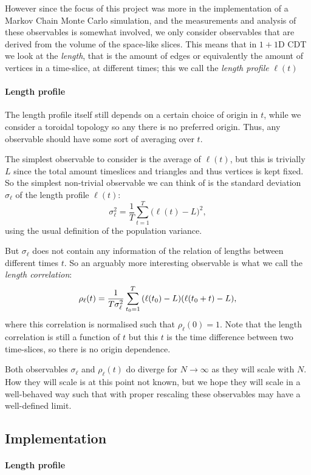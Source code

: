 However since the focus of this project was more in the implementation of a Markov Chain Monte Carlo simulation, and the measurements and analysis of these observables is somewhat involved, we only consider observables that are derived from the volume of the space-like slices.
This means that in $1 + 1$D CDT we look at the \emph{length}, that is the amount of edges or equivalently the amount of vertices in a time-slice, at different times; this we call the \emph{length profile} $\ell(t)$

\paragraph{Length profile}
The length profile itself still depends on a certain choice of origin in $t$, while we consider a toroidal topology so any there is no preferred origin. Thus, any observable should have some sort of averaging over $t$.

The simplest observable to consider is the average of $\ell(t)$, but this is trivially $L$ since the total amount timeslices and triangles and thus vertices is kept fixed.
So the simplest non-trivial observable we can think of is the standard deviation $\sigma_\ell$ of the length profile $\ell(t)$:
\begin{equation}
    \sigma_\ell^2 = \frac{1}{T} \sum_{t = 1}^{T} \Big(\ell(t) - L\Big)^2,
\end{equation}
using the usual definition of the population variance.

But $\sigma_\ell$ does not contain any information of the relation of lengths between different times $t$.
So an arguably more interesting observable is what we call the \emph{length correlation}:
\begin{equation}
    \rho_\ell(t) = \frac{1}{T \sigma_\ell^2} \sum_{t_0 = 1}^{T} \qty(\ell(t_0) - L)\qty(\ell(t_0 + t) - L),
\end{equation}
where this correlation is normalised such that $\rho_\ell(0) = 1$.
Note that the length correlation is still a function of $t$ but this $t$ is the time difference between two time-slices, so there is no origin dependence.

Both observables $\sigma_\ell$ and $\rho_\ell(t)$ do diverge for $N \rightarrow \infty$ as they will scale with $N$.
How they will scale is at this point not known, but we hope they will scale in a well-behaved way such that with proper rescaling these observables may have a well-defined limit.

\subsection{Implementation}

\paragraph{Length profile}
